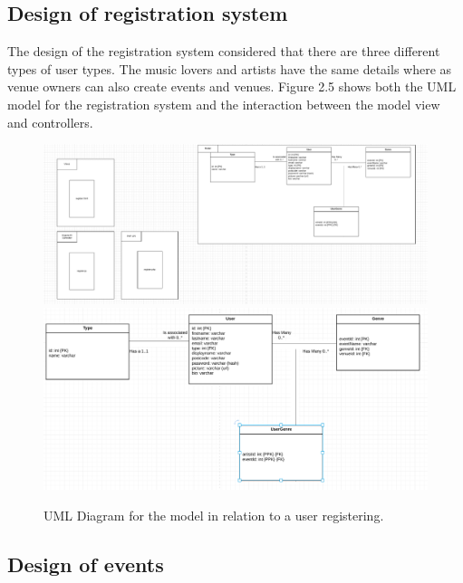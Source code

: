 \subsection{Design of registration system}
The design of the registration system considered that there are three different types of user types. The music lovers and artists have the same details where as venue owners can also create events and venues. Figure 2.5 shows both the UML model for the registration system and the interaction between the model view and controllers.

\begin{figure}[H]
\includegraphics[width=\textwidth,height=\textheight,keepaspectratio]{images/register}
\includegraphics[width=\textwidth,height=\textheight,keepaspectratio]{images/users}
\caption{UML Diagram for the model in relation to a user registering.}
\end{figure}



\subsection{Design of events}

